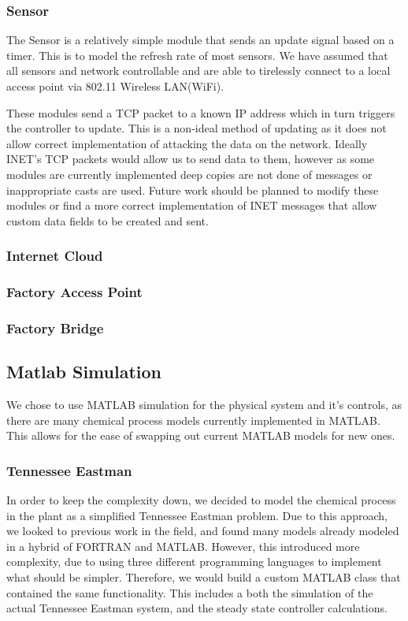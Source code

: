 \subsubsection{Sensor}


The Sensor is a relatively simple module that sends an update signal based on a timer. This is to model the refresh rate of most sensors. We have assumed that all sensors and network controllable and are able to tirelessly connect to a local access point via 802.11 Wireless LAN(WiFi). 

These modules send a TCP packet to a known IP address which in turn triggers the controller to update. This is a non-ideal method of updating as it does not allow correct implementation of attacking the data on the network. Ideally INET's TCP packets would allow us to send data to them, however as some modules are currently implemented deep copies are not done of messages or inappropriate casts are used. Future work should be planned to modify these modules or find a more correct
implementation of INET messages that allow custom data fields to be created and sent. 

\subsubsection{Internet Cloud}

\subsubsection{Factory Access Point}

\subsubsection{Factory Bridge}

\subsection{Matlab Simulation}
 We chose to use MATLAB simulation for the physical system and it's controls, as there are many chemical process models currently implemented in MATLAB. This allows for the ease of swapping out current MATLAB models for new ones.

\subsubsection{Tennessee Eastman}
 In order to keep the complexity down, we decided to model the chemical process in the plant as a simplified Tennessee Eastman problem. Due to this approach, we looked to previous work in the field, and found many models already modeled in a hybrid of FORTRAN and MATLAB.  However, this introduced more complexity, due to using three different programming languages to implement what should be simpler.  Therefore, we would build a custom MATLAB class that contained the same functionality.  This includes a both the simulation of the actual Tennessee Eastman system, and the steady state controller calculations.


